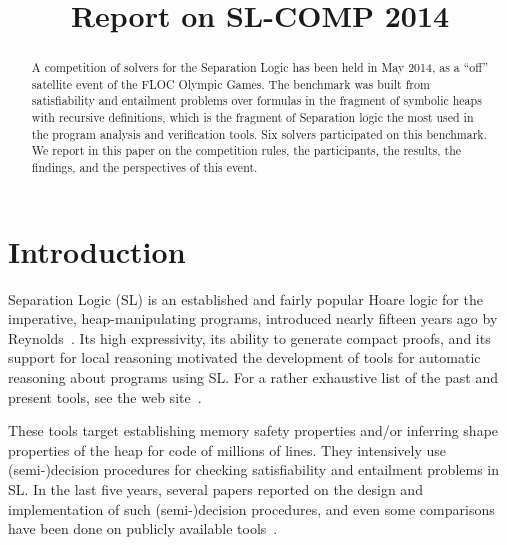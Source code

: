 \documentclass{llncs}
\title{Report on SL-COMP 2014}
\author{}
\institute{}
\date{}
\begin{document}
\sloppy
\maketitle


\begin{abstract}
A competition of solvers for the Separation Logic 
has been held in May 2014, 
as a ``off'' satellite event of the FLOC Olympic Games.
The benchmark was built from satisfiability and entailment problems
over formulas in the fragment of symbolic heaps with recursive definitions, 
which is the fragment of Separation logic the most used in the program analysis and verification tools.
Six solvers participated on this benchmark. 
We report in this paper on 
the competition rules, the participants, the results, the findings, and  
the perspectives of this event.
\end{abstract}


\section{Introduction}

Separation Logic (SL) is an established and fairly popular Hoare logic 
for the imperative, heap-manipulating programs, 
introduced nearly fifteen years ago by Reynolds~\cite{Reynolds99,OHearnRY01,Reynolds02}. 
%
Its high expressivity, its ability to generate compact proofs, and 
its support for local reasoning 
motivated the development of tools for automatic reasoning about programs using SL.
For a rather exhaustive list of the past and present tools, see the web site~\cite{OHearn-SLsite}.

These tools target establishing memory safety properties and/or inferring shape properties of the heap for code of millions of lines.
They intensively use (semi-)decision procedures for checking satisfiability and entailment problems in SL.
In the last five years, several papers reported on the design and implementation of such (semi-)decision procedures, and even some comparisons have been done on publicly available tools~\cite{HasseIOP13}.
\end{document}

